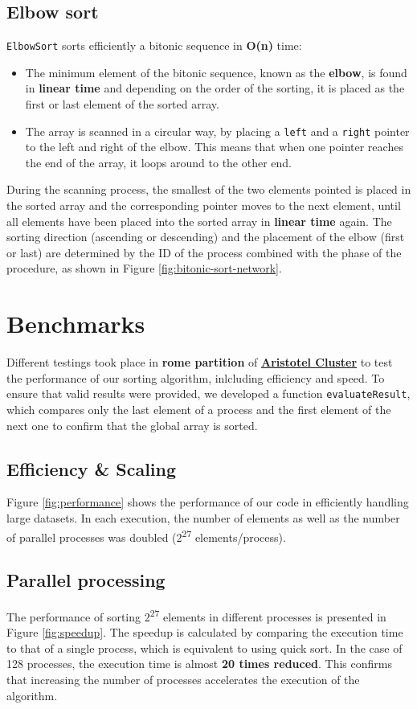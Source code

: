 \documentclass{article}
\begin{document}
\subsection{Elbow sort}
\texttt{ElbowSort} sorts efficiently a bitonic sequence in \textbf{O(n)} time:
\begin{itemize}
\item
The minimum element of the bitonic sequence, known as the \textbf{elbow}, is found in \textbf{linear time} and depending on the order of the sorting, it is placed as the first or last element of the sorted array.
\item 
The array is scanned in a circular way, by placing a \texttt{left} and a \texttt{right} pointer to the left and right of the elbow. This means that when one pointer reaches the end of the array, it loops around to the other end.  
\end{itemize}
During the scanning process, the smallest of the two elements pointed is placed in the sorted array and the corresponding pointer moves to the next element, until all elements have been placed into the sorted array in \textbf{linear time} again. The sorting direction (ascending or descending) and the placement of the elbow (first or last) are determined by the ID of the process combined with the phase of the procedure, as shown in Figure \ref{fig:bitonic-sort-network}.

\section{Benchmarks}
Different testings took place in \textbf{rome partition} of \href{https://hpc.it.auth.gr/}{\textbf{Aristotel Cluster}} to test the performance of our sorting algorithm, inlcluding efficiency and speed. To ensure that valid results were provided, we developed a function \texttt{evaluateResult}, which compares only the last element of a process and the first element of the next one to confirm that the global array is sorted.

\subsection{Efficiency \& Scaling}
Figure \ref{fig:performance} shows the performance of our code in efficiently handling large datasets. In each execution, the number of elements as well as the number of parallel processes was doubled (2\textsuperscript{27} elements/process).

\subsection{Parallel processing}
The performance of sorting 2\textsuperscript{27} elements in different processes is presented in Figure \ref{fig:speedup}. The speedup is calculated by comparing the execution time to that of a single process, which is equivalent to using quick sort. In the case of 128 processes, the execution time is almost \textbf{20 times reduced}. This confirms that increasing the number of processes accelerates the execution of the algorithm.
\end{document}
